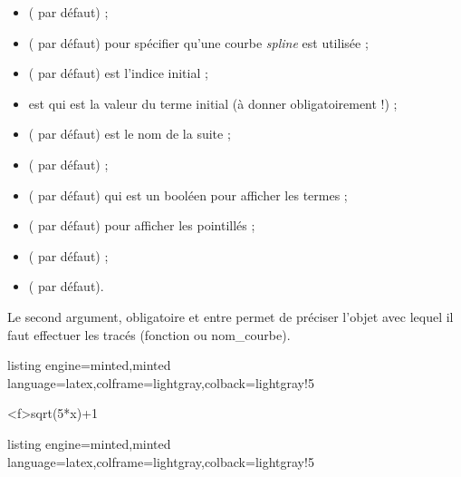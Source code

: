 \documentclass[11pt,a4paper]{ltxdoc}
\begin{document}
\begin{itemize}
	\item {} ( par défaut) ;
	\item {} ( par défaut) pour spécifier qu'une courbe \textit{spline} est utilisée ;
	\item {} ( par défaut) est l'indice initial ;
	\item {} est qui est la valeur du terme initial (à donner obligatoirement !) ;
	\item {} ( par défaut) est le nom de la suite ;
	\item {} ( par défaut) ;
	\item {} ( par défaut) qui est un booléen pour afficher les termes ;
	\item {} ( par défaut) pour afficher les pointillés ;
	\item {} ( par défaut) ;
	\item {} ( par défaut).
\end{itemize}

Le second argument, obligatoire et entre  permet de préciser l'objet avec lequel il faut effectuer les tracés (fonction ou nom\_courbe).

\begin{tcblisting}{listing engine=minted,minted language=latex,colframe=lightgray,colback=lightgray!5}
\begin{GraphiqueTikz}%
	[x=0.75cm,y=0.75cm,Xmin=0,Xmax=10,Xgrille=1,Xgrilles=0.5,
	Ymin=0,Ymax=8,Ygrille=1,Ygrilles=0.5]
	{sqrt(5*x)+1}
\end{GraphiqueTikz}
\end{tcblisting}

\begin{tcblisting}{listing engine=minted,minted language=latex,colframe=lightgray,colback=lightgray!5}
\begin{GraphiqueTikz}[x=4cm,y=3cm,Xmin=0,Xmax=2.5,Xgrille=1,Xgrilles=0.25,
	Ymin=0,Ymax=1.25,Ygrille=0.5,Ygrilles=0.25]
\end{GraphiqueTikz}
\end{tcblisting}
\end{document}
